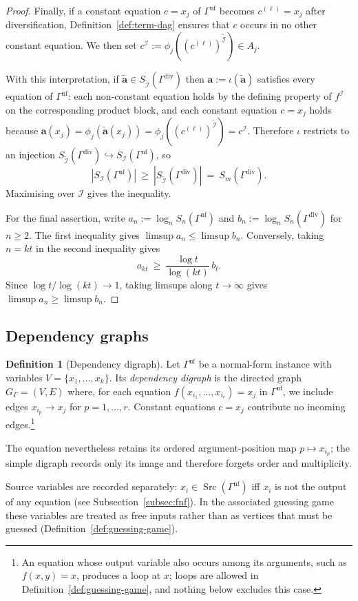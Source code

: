 \documentclass[11pt]{article}
\theoremstyle{plain}
\theoremstyle{definition}
\theoremstyle{definition}
\newtheorem{definition}[theorem]{Definition}
\theoremstyle{remark}
\newcommand{\A}{A}
\newcommand{\abs}[1]{\left\lvert #1 \right\rvert}
\newcommand{\Src}{\operatorname{Src}}
\begin{document}
\begin{proof}
Finally, if a constant equation $c=x_j$ of $\Gamma^{\mathrm{nf}}$ becomes
$c^{(\ell)}=x_j$ after diversification, Definition~\ref{def:term-dag} ensures that $c$ occurs in no other constant
equation.  We then set $c^{\mathcal I}:=\phi_j((c^{(\ell)})^{\tilde{\mathcal I}})\in \A_j$.

With this interpretation, if $\tilde{\mathbf a}\in S_{\tilde{\mathcal I}}(\Gamma^{\mathrm{div}})$ then
$\mathbf a:=\iota(\tilde{\mathbf a})$ satisfies every equation of $\Gamma^{\mathrm{nf}}$:
each non-constant equation holds by the defining property of $f^{\mathcal I}$ on the corresponding product block,
and each constant equation $c=x_j$ holds because
$\mathbf a(x_j)=\phi_j(\tilde{\mathbf a}(x_j))
=\phi_j((c^{(\ell)})^{\tilde{\mathcal I}})=c^{\mathcal I}$.
Therefore $\iota$ restricts to an injection
$S_{\tilde{\mathcal I}}(\Gamma^{\mathrm{div}})\hookrightarrow S_{\mathcal I}(\Gamma^{\mathrm{nf}})$, so
\[
\abs{S_{\mathcal I}(\Gamma^{\mathrm{nf}})}
\ \ge\ \abs{S_{\tilde{\mathcal I}}(\Gamma^{\mathrm{div}})}
\ =\ S_m(\Gamma^{\mathrm{div}}).
\]
Maximising over $\mathcal I$ gives the inequality.

For the final assertion, write
\(a_n:=\log_n S_n(\Gamma^{\mathrm{nf}})\) and
\(b_n:=\log_n S_n(\Gamma^{\mathrm{div}})\) for $n\ge 2$.
The first inequality gives $\limsup a_n\le \limsup b_n$.
Conversely, taking $n=kt$ in the second inequality gives
\[
  a_{kt}\ \ge\ \frac{\log t}{\log(kt)}\,b_t .
\]
Since $\log t/\log(kt)\to 1$, taking limsups along $t\to\infty$ gives
$\limsup a_n\ge\limsup b_n$.
\end{proof}

\subsection{Dependency graphs}

\begin{definition}[Dependency digraph]
\label{def:dep-graph}
Let $\Gamma^{\mathrm{nf}}$ be a normal-form instance with variables $V=\{x_1,\dots,x_k\}$.
Its \emph{dependency digraph} is the directed graph $G_\Gamma=(V,E)$ where, for each equation
$f(x_{i_1},\dots,x_{i_r})=x_j$ in $\Gamma^{\mathrm{nf}}$, we include edges $x_{i_p}\to x_j$ for $p=1,\dots,r$.
Constant equations $c=x_j$ contribute no incoming edges.\footnote{An equation whose output variable also occurs among its arguments, such as
$f(x,y)=x$, produces a loop at $x$; loops are allowed in Definition~\ref{def:guessing-game},
and nothing below excludes this case.}

The equation nevertheless retains its ordered argument-position map
\(p\mapsto x_{i_p}\); the simple digraph records only its image and therefore forgets order and multiplicity.

Source variables are recorded separately: $x_i\in\Src(\Gamma^{\mathrm{nf}})$ iff $x_i$ is not the output of any equation
(see Subsection~\ref{subsec:fnf}).
In the associated guessing game these variables are treated as free inputs rather than as vertices that must be
guessed (Definition~\ref{def:guessing-game}).
\end{definition}
\end{document}
